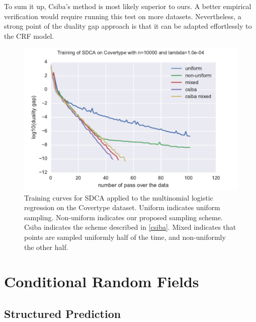 \documentclass{article}
\DeclareMathOperator{\1}{\mathbb{1}}
\begin{document}
To sum it up, Csiba's method is most likely superior to ours.
A better empirical verification would require running this test on more datasets.
Nevertheless, a strong point of the duality gap approach is that it can be adapted effortlessly to the CRF model.

\begin{figure}[ht]
	\center
	\includegraphics[width=.8\textwidth]{images/20170914_065817_covertype_perf.pdf}
	\caption{
	Training curves for SDCA applied to the multinomial logistic regression on the Covertype dataset. Uniform indicates uniform sampling. Non-uniform indicates our proposed sampling scheme. Csiba indicates the scheme described in \ref{csiba}. Mixed indicates that points are sampled uniformly half of the time, and non-uniformly the other half.
	}
	\label{training covertype}
\end{figure}

\clearpage
\section{Conditional Random Fields}

\subsection{Structured Prediction}
\end{document}
